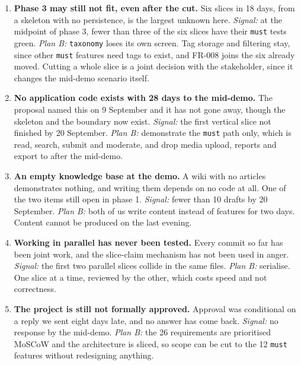 \documentclass[11pt]{article}
\begin{document}
\begin{enumerate}
  \item \textbf{Phase 3 may still not fit, even after the cut.} Six slices in 18 days, from a
        skeleton with no persistence, is the largest unknown here.
        \emph{Signal:} at the midpoint of phase 3, fewer than three of the six slices have their
        \texttt{must} tests green.
        \emph{Plan B:} \texttt{taxonomy} loses its own screen. Tag storage and filtering stay, since
        other \texttt{must} features need tags to exist, and FR-008 joins the six already moved.
        Cutting a whole slice is a joint decision with the stakeholder, since it changes the
        mid-demo scenario itself.

  \item \textbf{No application code exists with 28 days to the mid-demo.} The proposal named this on
        9 September and it has not gone away, though the skeleton and the boundary now exist.
        \emph{Signal:} the first vertical slice not finished by 20 September.
        \emph{Plan B:} demonstrate the \texttt{must} path only, which is read, search, submit and
        moderate, and drop media upload, reports and export to after the mid-demo.

  \item \textbf{An empty knowledge base at the demo.} A wiki with no articles demonstrates nothing,
        and writing them depends on no code at all. One of the two items still open in phase 1.
        \emph{Signal:} fewer than 10 drafts by 20 September.
        \emph{Plan B:} both of us write content instead of features for two days. Content cannot be
        produced on the last evening.

  \item \textbf{Working in parallel has never been tested.} Every commit so far has been joint work,
        and the slice-claim mechanism has not been used in anger.
        \emph{Signal:} the first two parallel slices collide in the same files.
        \emph{Plan B:} serialise. One slice at a time, reviewed by the other, which costs speed and
        not correctness.

  \item \textbf{The project is still not formally approved.} Approval was conditional on a reply we
        sent eight days late, and no answer has come back.
        \emph{Signal:} no response by the mid-demo.
        \emph{Plan B:} the 26 requirements are prioritised MoSCoW and the architecture is sliced, so
        scope can be cut to the 12 \texttt{must} features without redesigning anything.
\end{enumerate}
\end{document}
